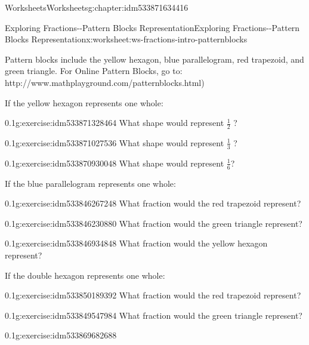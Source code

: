 \documentclass[twoside,11pt,]{book}
\begin{document}
\begin{chapterptx}{Worksheets}{}{Worksheets}{}{}{g:chapter:idm533871634416}
\begin{worksheet-section-numberless}{Exploring Fractions-{}-{}Pattern Blocks Representation}{}{Exploring Fractions-{}-{}Pattern Blocks Representation}{}{}{x:worksheet:ws-fractions-intro-patternblocks}
\begin{introduction}{}
Pattern blocks include the yellow hexagon, blue parallelogram, red trapezoid, and green triangle. For Online Pattern Blocks, go to: http:\slash{}\slash{}www.mathplayground.com\slash{}patternblocks.html)%
\end{introduction}%
\begin{introduction}{}%
If the yellow hexagon represents one whole:%
\end{introduction}%
\begin{divisionexercise}{1}{}{0.1}{g:exercise:idm533871328464}%
What shape would represent \(\frac{1}{2} \) ?%
\end{divisionexercise}%
\begin{divisionexercise}{2}{}{0.1}{g:exercise:idm533871027536}%
What shape would represent \(\frac{1}{3} \) ?%
\end{divisionexercise}%
\begin{divisionexercise}{3}{}{0.1}{g:exercise:idm533870930048}%
What shape would represent \(\frac{1}{6} \)?%
\end{divisionexercise}%
\begin{introduction}{}%
If the blue parallelogram represents one whole:%
\end{introduction}%
\begin{divisionexercise}{4}{}{0.1}{g:exercise:idm533846267248}%
What fraction would the red trapezoid represent?%
\end{divisionexercise}%
\begin{divisionexercise}{5}{}{0.1}{g:exercise:idm533846230880}%
What fraction would the green triangle represent?%
\end{divisionexercise}%
\clearpage
\begin{divisionexercise}{6}{}{0.1}{g:exercise:idm533846934848}%
What fraction would the yellow hexagon represent?%
\end{divisionexercise}%
\begin{introduction}{}%
If the double hexagon represents one whole:%
\end{introduction}%
\begin{divisionexercise}{7}{}{0.1}{g:exercise:idm533850189392}%
What fraction would the red trapezoid represent?%
\end{divisionexercise}%
\begin{divisionexercise}{8}{}{0.1}{g:exercise:idm533849547984}%
What fraction would the green triangle represent?%
\end{divisionexercise}%
\begin{divisionexercise}{9}{}{0.1}{g:exercise:idm533869682688}%

\end{divisionexercise}
\end{worksheet-section-numberless}
\end{chapterptx}
\end{document}

